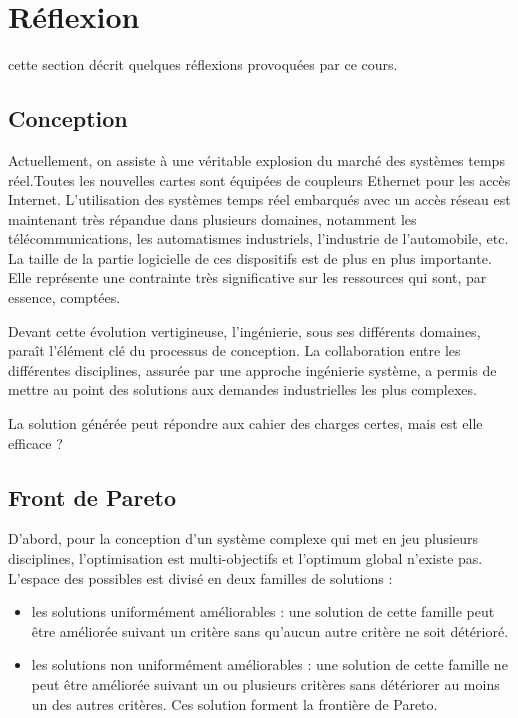 \section{Réflexion}

cette section décrit quelques réflexions provoquées par ce cours.

\subsection{Conception}

Actuellement, on assiste à une véritable explosion du marché des systèmes temps
réel.Toutes les nouvelles cartes sont équipées de coupleurs Ethernet pour les
accès Internet. L'utilisation des systèmes temps réel embarqués avec un accès
réseau est maintenant très répandue dans plusieurs domaines, notamment les
télécommunications, les automatismes industriels, l'industrie de l’automobile,
etc. La taille de la partie logicielle de ces dispositifs est de plus en plus
importante. Elle représente une contrainte très significative sur les ressources
qui sont, par essence, comptées.

Devant cette évolution vertigineuse, l'ingénierie, sous ses différents domaines,
paraît l'élément clé du processus de conception. La collaboration entre les
différentes disciplines, assurée par une approche ingénierie système, a permis
de mettre au point des solutions aux demandes industrielles les plus complexes.

La solution générée peut répondre aux cahier des charges certes, mais est elle
efficace ?

\subsection{Front de Pareto}

D'abord, pour la conception d'un système complexe qui met en jeu plusieurs
disciplines, l'optimisation est multi-objectifs et l'optimum global n'existe
pas. L'espace des possibles est divisé en deux familles de solutions :
\begin{itemize}
\item les solutions uniformément améliorables : une solution de cette famille
peut être améliorée suivant un critère sans qu'aucun autre critère ne soit
détérioré.
\item les solutions non uniformément améliorables : une solution de cette
famille ne peut être améliorée suivant un ou plusieurs critères sans détériorer
au moins un des autres critères. Ces solution forment la frontière de Pareto.
\end{itemize}

